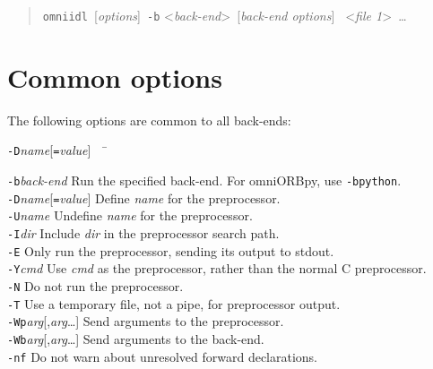 \documentclass[11pt,oneside,a4paper]{book}
\newcommand{\cmdline}[1]{\texttt{#1}}
\begin{document}
\begin{quote} %
\cmdline{omniidl }[\textit{options}]\cmdline{ -b}%
<\textit{back-end}>\cmdline{ }[\textit{back-end options}]%
\cmdline{ }<\textit{file 1}>\cmdline{ }\dots
\end{quote}

\section{Common options}

The following options are common to all back-ends:

\begin{tabbing}
\cmdline{-D}\textit{name}[\cmdline{=}\textit{value}]~~ \= \kill

\cmdline{-b}\textit{back-end}
     \> Run the specified back-end. For omniORBpy, use \cmdline{-bpython}.\\

\cmdline{-D}\textit{name}[\cmdline{=}\textit{value}]
     \> Define \textit{name} for the preprocessor.\\

\cmdline{-U}\textit{name}
     \> Undefine \textit{name} for the preprocessor.\\

\cmdline{-I}\textit{dir}
     \> Include \textit{dir} in the preprocessor search path.\\

\cmdline{-E}
     \> Only run the preprocessor, sending its output to stdout.\\

\cmdline{-Y}\textit{cmd}
     \> Use \textit{cmd} as the preprocessor, rather than the normal C
        preprocessor.\\

\cmdline{-N}
     \> Do not run the preprocessor.\\

\cmdline{-T}
     \> Use a temporary file, not a pipe, for preprocessor output.\\

\cmdline{-Wp}\textit{arg}[,\textit{arg}\dots]
     \> Send arguments to the preprocessor.\\

\cmdline{-Wb}\textit{arg}[,\textit{arg}\dots]
     \> Send arguments to the back-end.\\

\cmdline{-nf}
     \> Do not warn about unresolved forward declarations.\\


\end{tabbing}
\end{document}
